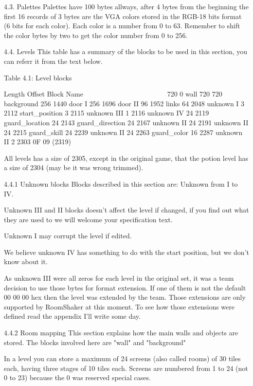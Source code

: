 4.3. Palettes
 Palettes have 100 bytes allways, after 4 bytes from the beginning the
 first 16 records of 3 bytes are the VGA colors stored in the RGB-18 bits
 format (6 bits for each color). Each color is a number from 0 to 63.
 Remember to shift the color bytes by two to get the color number from 0
 to 256.
 
4.4. Levels
 This table has a summary of the blocks to be used in this section,
 you can referr it from the text below.

                   Table 4.1: Level blocks
                   ~~~~~~~~~~~~~~~~~~~~~~~

 Length Offset  Block Name
 ~~~~~~ ~~~~~~  ~~~~~~~~~~
 720    0       wall
 720    720     background
 256    1440    door I
 256    1696    door II
 96     1952    links
 64     2048    unknown I
 3      2112    start_position
 3      2115    unknown III
 1      2116    unknown IV
 24     2119    guard_location
 24     2143    guard_direction
 24     2167    unknown II
 24     2191    unknown II
 24     2215    guard_skill
 24     2239    unknown II
 24     2263    guard_color
 16     2287    unknown II
 2      2303    0F 09 (2319)

 All levels has a size of 2305, except in the original game, that the
 potion level has a size of 2304 (may be it was wrong trimmed).

4.4.1 Unknown blocks
 Blocks described in this section are: Unknown from I to IV.

 Unknown III and II blocks doesn't affect the level if changed, if you find
 out what they are used to we will welcome your specification text.

 Unknown I may corrupt the level if edited.

 We believe unknown IV has something to do with the start position, but we
 don't know about it.

 As unknown III were all zeros for each level in the original set, it was a
 team decision to use those bytes for format extension. If one of them is
 not the default 00 00 00 hex then the level was extended by the team.
 Those extensions are only supported by RoomShaker at this  moment. To see
 how those extensions were defined read the appendix I'll write some day.
 
4.4.2 Room mapping
 This section explains how the main walls and objects are stored. The
 blocks involved here are "wall" and "background"

 In a level you can store a maximum of 24 screens (also called rooms) of 30
 tiles each, having three stages of 10 tiles each. Screens are numbered
 from 1 to 24 (not 0 to 23) because the 0 was reserved special cases.

